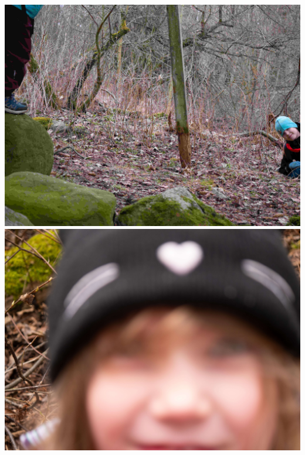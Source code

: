 \begin{multicols}{2}
	\noindent\includegraphics[width=0.9\linewidth]{assets/kolkkienpäiväretki11}
	\noindent\includegraphics[width=0.9\linewidth]{assets/kolkkienpäiväretki12}

\end{multicols}

